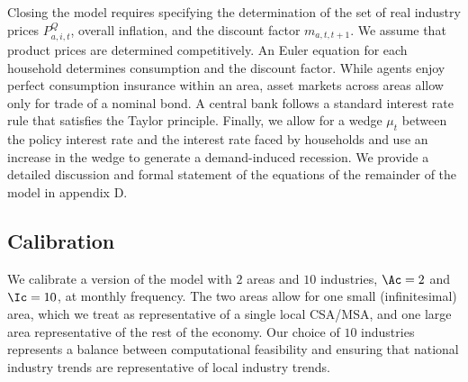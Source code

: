 \documentclass[12pt]{article}
\newcommand{\CiteReference}{../reference.bib}
\theoremstyle{definition}
\begin{document}
Closing the model requires specifying the determination of the set of real industry prices $P_{a, i, t}^{Q}$, overall inflation, and the discount factor $m_{a, t, t+1}$. We assume that product prices are determined competitively. An Euler equation for each household determines consumption and the discount factor. While agents enjoy perfect consumption insurance within an area, asset markets across areas allow only for trade of a nominal bond. A central bank follows a standard interest rate rule that satisfies the Taylor principle. Finally, we allow for a wedge $\mu_t$ between the policy interest rate and the interest rate faced by households and use an increase in the wedge to generate a demand-induced recession. We provide a detailed discussion and formal statement of the equations of the remainder of the model in appendix D.

\subsection{Calibration}

We calibrate a version of the model with $2$ areas and $10$ industries, $\Ac = 2$ and $\Ic = 10$, at monthly frequency. The two areas allow for one small (infinitesimal) area, which we treat as representative of a single local CSA/MSA, and one large area representative of the rest of the economy. Our choice of $10$ industries represents a balance between computational feasibility and ensuring that national industry trends are representative of local industry trends.






 
\end{document}
